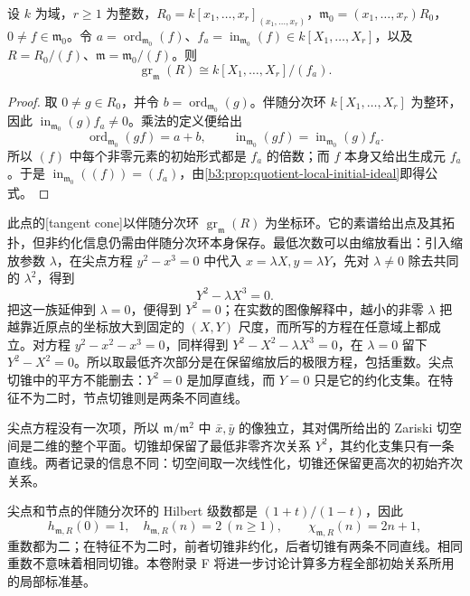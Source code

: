 \begin{proposition}\label{b3:prop:hypersurface-tangent-cone}
	设 \(k\) 为域，\(r\ge1\) 为整数，\(R_0=k[x_1,\ldots,x_r]_{(x_1,\ldots,x_r)}\)，\(\mathfrak m_0=(x_1,\ldots,x_r)R_0\)，\(0\ne f\in\mathfrak m_0\)。令 \(a=\operatorname{ord}_{\mathfrak m_0}(f)\)、\(f_a=\operatorname{in}_{\mathfrak m_0}(f)\in k[X_1,\ldots,X_r]\)，以及 \(R=R_0/(f)\)、\(\mathfrak m=\mathfrak m_0/(f)\)。则
	\[
		\operatorname{gr}_{\mathfrak m}(R)\cong k[X_1,\ldots,X_r]/(f_a).
	\]
\end{proposition}
\begin{proof}
	取 \(0\ne g\in R_0\)，并令 \(b=\operatorname{ord}_{\mathfrak m_0}(g)\)。伴随分次环 \(k[X_1,\ldots,X_r]\) 为整环，因此 \(\operatorname{in}_{\mathfrak m_0}(g)f_a\ne0\)。乘法的定义便给出
	\[
		\operatorname{ord}_{\mathfrak m_0}(gf)=a+b, \qquad \operatorname{in}_{\mathfrak m_0}(gf) =\operatorname{in}_{\mathfrak m_0}(g)f_a.
	\]
	所以 \((f)\) 中每个非零元素的初始形式都是 \(f_a\) 的倍数；而 \(f\) 本身又给出生成元 \(f_a\)。于是 \(\operatorname{in}_{\mathfrak m_0}((f))=(f_a)\)，由\cref{b3:prop:quotient-local-initial-ideal}即得公式。
\end{proof}

此点的[tangent cone]以伴随分次环 \(\operatorname{gr}_{\mathfrak m}(R)\) 为坐标环。它的素谱给出点及其拓扑，但非约化信息仍需由伴随分次环本身保存。最低次数可以由缩放看出：引入缩放参数 \(\lambda\)，在尖点方程 \(y^2-x^3=0\) 中代入 \(x=\lambda X,y=\lambda Y\)，先对 \(\lambda\ne0\) 除去共同的 \(\lambda^2\)，得到
\[
	Y^2-\lambda X^3=0.
\]
把这一族延伸到 \(\lambda=0\)，便得到 \(Y^2=0\)；在实数的图像解释中，越小的非零 \(\lambda\) 把越靠近原点的坐标放大到固定的 \((X,Y)\) 尺度，而所写的方程在任意域上都成立。对方程 \(y^2-x^2-x^3=0\)，同样得到 \(Y^2-X^2-\lambda X^3=0\)，在 \(\lambda=0\) 留下 \(Y^2-X^2=0\)。所以取最低齐次部分是在保留缩放后的极限方程，包括重数。尖点切锥中的平方不能删去：\(Y^2=0\) 是加厚直线，而 \(Y=0\) 只是它的约化支集。在特征不为二时，节点切锥则是两条不同直线。

尖点方程没有一次项，所以 \(\mathfrak m/\mathfrak m^2\) 中 \(\bar x,\bar y\) 的像独立，其对偶所给出的 Zariski 切空间是二维的整个平面。切锥却保留了最低非零齐次关系 \(Y^2\)，其约化支集只有一条直线。两者记录的信息不同：切空间取一次线性化，切锥还保留更高次的初始齐次关系。

\ProseParagraphBreak
尖点和节点的伴随分次环的 Hilbert 级数都是 \((1+t)/(1-t)\)，因此
\[
	h_{\mathfrak m,R}(0)=1,\quad h_{\mathfrak m,R}(n)=2\ (n\ge1), \qquad \chi_{\mathfrak m,R}(n)=2n+1,
\]
重数都为二；在特征不为二时，前者切锥非约化，后者切锥有两条不同直线。相同重数不意味着相同切锥。本卷附录 F 将进一步讨论计算多方程全部初始关系所用的局部标准基。


